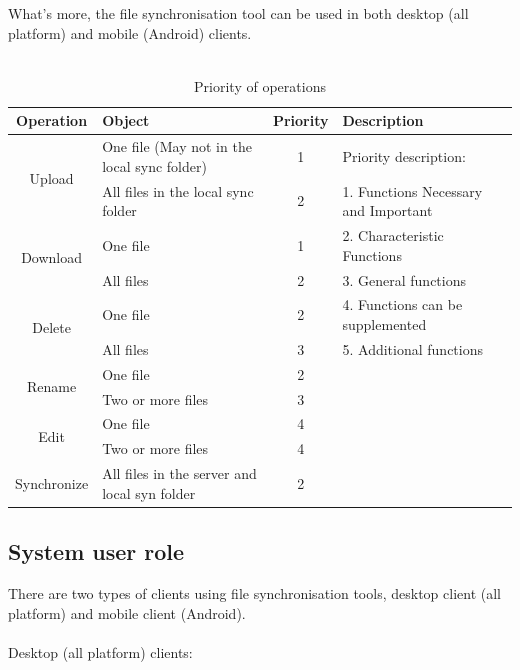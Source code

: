 What’s more, the file synchronisation tool can be used in both desktop (all platform) and mobile (Android) clients.\\\\
\begin{table}[H]
\caption{Priority of operations}
\centering
\begin{tabular}{|c|p{2cm}|c|p{3cm}|}
\hline
Operation & Object & Priority & Description \\
\hline
\multirow{2}{*}{Upload}&{One file (May not in the local sync folder)}&1&{Priority description:}\\
\cline{2-3}
&All files in the local sync folder&2&{1. Functions Necessary and Important}\\
\cline{1-3}
\multirow{2}{*}{Download}&{One file}&1&{2. Characteristic Functions}\\
\cline{2-3}
&All files&2&{3. General functions}\\
\cline{1-3}
\multirow{2}{*}{Delete}&{One file}&2&{4. Functions can be supplemented}\\
\cline{2-3}
&All files&3&{5. Additional functions}\\
\cline{1-3}
\multirow{2}{*}{Rename}&{One file}&2&{}\\
\cline{2-3}
&Two or more files&3&{}\\
\cline{1-3}
\multirow{2}{*}{Edit}&{One file}&4&{}\\
\cline{2-3}
&Two or more files&4&{}\\
\cline{1-3}
\multirow{1}{*}{Synchronize}&{All files in the server and local syn folder}&2&{}\\
\cline{1-4}
\bottomrule
\end{tabular}
\end{table}

\subsection{System user role}
There are two types of clients using file synchronisation tools, desktop client (all platform) and mobile client (Android).\\\\
Desktop (all platform) clients:

